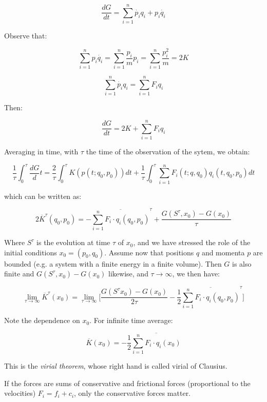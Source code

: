 \documentclass{article}
\begin{document}
$$\frac{dG}{dt}= \sum_{i=1}^{n} \dot{p_i} q_i + p_i \dot{q_i}$$

Observe that:

$$ \sum_{i=1}^{n} p_i \dot{q_i} =  \sum_{i=1}^{n} \frac{p_i}{m} p_i = \sum_{i=1}^{n} \frac{p_i^2}{m} = 2K$$

$$\sum_{i=1}^{n} \dot{p_i} q_i = \sum_{i=1}^{n} F_i q_i $$

Then:

$$ \frac{dG}{dt}=2K+ \sum_{i=1}^{n} F_i q_i $$

Averaging in time, with $\tau$ the time of the observation of the sytem, we obtain:

\begin{equation}
\frac{1}{\tau} \int_{0}^{\tau}  \frac{dG} dt = \frac{2}{\tau}  \int_{0}^{\tau} K(p(t;q_0,p_0))dt + \frac{1}{\tau} \int_{0}^{\tau}  \sum_{i=1}^{n} F_i (t;q,q_0)q_i(t,q_0,p_0) dt
\end{equation}

which can be written as:

\begin{equation}
2 \overline{K}^{\tau}(q_0,p_0) = - \overline{\sum_{i=1}^{n} F_i  \cdot q_i(q_0,p_0)}^{\tau} + \frac{G(S^{\tau},x_0)-G(x_0)}{\tau}
\end{equation}

Where $S^{\tau}$ is the evolution at time $\tau$ of $x_0$, and we have stressed the role of the initial conditions $x_0=(p_0,q_0)$. Assume now that positions $q$ and momenta $p$ are bounded (e.g. a system with a finite energy in a finite volume). Then $G$ is also finite and $G(S^{\tau},x_0)-G(x_0)$ likewise, and $\tau \to \infty$, we then have:

$$\lim\limits_{\tau \to \infty} \overline{K}^{\tau}(x_0) = \lim\limits_{\tau \to \infty} \Big [ \frac{G(S^{\tau}x_0)-G(x_0)}{2\tau}
- \frac{1}{2} \overline{\sum_{i=1}^{n} F_i  \cdot q_i(q_0,p_0)}^{\tau} \Big] $$

Note the dependence on $x_0$. For infinite time average:

\begin{equation}
\overline{K}(x_0) = - \frac{1}{2} \overline{\sum_{i=1}^{n} F_i  \cdot q_i(x_0)}
\end{equation}

This is the \emph{virial theorem}, whose right hand is called virial of Clausius. 
\newline

If the forces are sums of conservative and frictional forces (proportional to the velocities) $F_i=f_i+c_i$, only the conservative forces matter.
\end{document}
